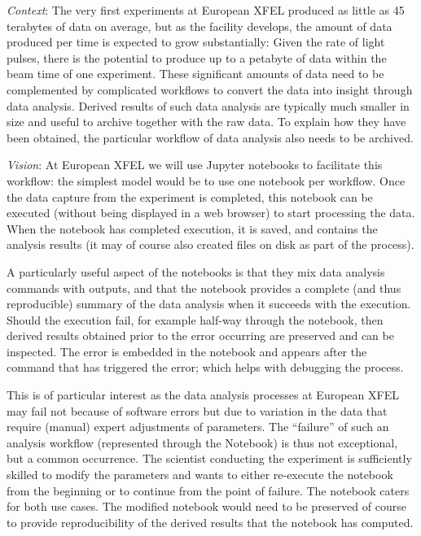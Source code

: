\begin{task}[
  title=Reproducible X-ray crystallography workflows at European XFEL,
  id=reproducibility-xfel,
  lead=XFEL,
  PM=36,
  wphases={6-48},
  partners={XFEL}
  ]
  \medskip \emph{Context}: The very first experiments at European XFEL
  produced as little as 45 terabytes of data on average, but as the
  facility develops, the amount of data produced per time is expected
  to grow substantially: Given the rate of light pulses, there is the
  potential to produce up to a petabyte of data within the beam time
  of one experiment. These significant amounts of data need to be
  complemented by complicated workflows to convert the data into
  insight through data analysis. Derived results of such data analysis
  are typically much smaller in size and useful to archive together
  with the raw data. To explain how they have been obtained, the
  particular workflow of data analysis also needs to be archived.

  \medskip \emph{Vision}: At European XFEL we will use Jupyter notebooks to facilitate
  this workflow: the simplest model would be to use one notebook per
  workflow. Once the data capture from the experiment is completed,
  this notebook can be executed (without being displayed in a web
  browser) to start processing the data. When the notebook has
  completed execution, it is saved, and contains the analysis results
  (it may of course also created files on disk as part of the
  process).

  A particularly useful aspect of the notebooks is that they mix data
  analysis commands with outputs, and that the notebook provides a
  complete (and thus reproducible) summary of the data analysis when
  it succeeds with the execution. Should the execution fail, for
  example half-way through the notebook, then derived results obtained
  prior to the error occurring are preserved and can be inspected. The
  error is embedded in the notebook and appears after the command that
  has triggered the error; which helps with debugging the process.

  This is of particular interest as the data analysis processes at
  European XFEL may fail not because of software errors but due to
  variation in the data that require (manual) expert adjustments of
  parameters. The ``failure'' of such an analysis workflow
  (represented through the Notebook) is thus not exceptional, but a
  common occurrence. The scientist conducting the experiment is
  sufficiently skilled to modify the parameters and wants to either
  re-execute the notebook from the beginning or to continue from the
  point of failure. The notebook caters for both use cases. The
  modified notebook would need to be preserved of course to provide
  reproducibility of the derived results that the notebook has
  computed.


\end{task}
